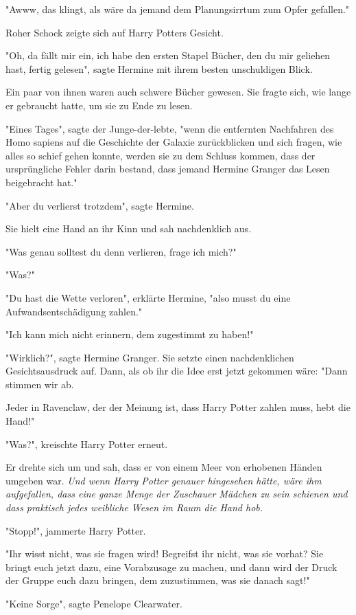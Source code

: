 {"Awww, das klingt, als wäre da jemand dem Planungsirrtum zum Opfer gefallen."

Roher Schock zeigte sich auf Harry Potters Gesicht.

"Oh, da fällt mir ein, ich habe den ersten Stapel Bücher, den du mir geliehen hast, fertig gelesen", sagte Hermine mit ihrem besten unschuldigen Blick.

Ein paar von ihnen waren auch schwere Bücher gewesen. Sie fragte sich, wie lange er gebraucht hatte, um sie zu Ende zu lesen.

"Eines Tages", sagte der Junge-der-lebte, "wenn die entfernten Nachfahren des Homo sapiens auf die Geschichte der Galaxie zurückblicken und sich fragen, wie alles so schief gehen konnte, werden sie zu dem Schluss kommen, dass der ursprüngliche Fehler darin bestand, dass jemand Hermine Granger das Lesen beigebracht hat."

"Aber du verlierst trotzdem", sagte Hermine.

Sie hielt eine Hand an ihr Kinn und sah nachdenklich aus.

"Was genau solltest du denn verlieren, frage ich mich?"

"Was?"

"Du hast die Wette verloren", erklärte Hermine, "also musst du eine Aufwandsentschädigung zahlen."

"Ich kann mich nicht erinnern, dem zugestimmt zu haben!"

"Wirklich?", sagte Hermine Granger. Sie setzte einen nachdenklichen Gesichtsausdruck auf. Dann, als ob ihr die Idee erst jetzt gekommen wäre: "Dann stimmen wir ab.

Jeder in Ravenclaw, der der Meinung ist, dass Harry Potter zahlen muss, hebt die Hand!"

"Was?", kreischte Harry Potter erneut.

Er drehte sich um und sah, dass er von einem Meer von erhobenen Händen umgeben war. \emph{Und wenn Harry Potter genauer hingesehen hätte, wäre ihm aufgefallen, dass eine ganze Menge der Zuschauer Mädchen zu sein schienen und dass praktisch jedes weibliche Wesen im Raum die Hand hob.}

"Stopp!", jammerte Harry Potter.

"Ihr wisst nicht, was sie fragen wird! Begreifst ihr nicht, was sie vorhat? Sie bringt euch jetzt dazu, eine Vorabzusage zu machen, und dann wird der Druck der Gruppe euch dazu bringen, dem zuzustimmen, was sie danach sagt!"

"Keine Sorge", sagte Penelope Clearwater.

}
